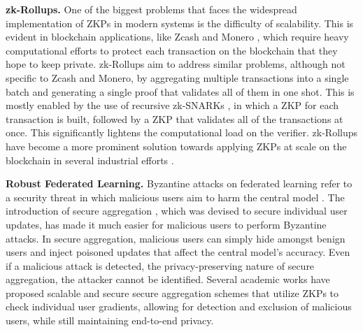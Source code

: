 
\textbf{zk-Rollups. }
One of the biggest problems that faces the widespread implementation of ZKPs in modern systems is the difficulty of scalability. This is evident in blockchain applications, like Zcash \cite{hopwood2016zcash} and Monero \cite{Monero2023}, which require heavy computational efforts to protect each transaction on the blockchain that they hope to keep private. zk-Rollups aim to address similar problems, although not specific to Zcash and Monero, by aggregating multiple transactions into a single batch and generating a single proof that validates all of them in one shot. This is mostly enabled by the use of recursive zk-SNARKs \cite{kothapalli2022nova}, in which a ZKP for each transaction is built, followed by a ZKP that validates all of the transactions at once. This significantly lightens the computational load on the verifier. zk-Rollups have become a more prominent solution towards applying ZKPs at scale on the blockchain in several industrial efforts \cite{0xPolygonZero2023Plonky2, PolygonLabs2023PolygonZkEVM}.

\textbf{Robust Federated Learning. }
Byzantine attacks on federated learning refer to a security threat in which malicious users aim to harm the central model \cite{fang2020local}. The introduction of secure aggregation \cite{bonawitz2017practical}, which was devised to secure individual user updates, has made it much easier for malicious users to perform Byzantine attacks. In secure aggregation, malicious users can simply hide amongst benign users and inject poisoned updates that affect the central model's accuracy. Even if a malicious attack is detected, the privacy-preserving nature of secure aggregation, the attacker cannot be identified. Several academic works \cite{ghodsi2023zprobe, so2020byzantine, roy2022eiffel, lycklama2023rofl} have proposed scalable and secure secure aggregation schemes that utilize ZKPs to check individual user gradients, allowing for detection and exclusion of malicious users, while still maintaining end-to-end privacy.

